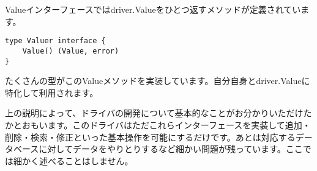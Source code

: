 Valueインターフェースではdriver.Valueをひとつ返すメソッドが定義されています。

\begin{lstlisting}[numbers=none]
type Valuer interface {
    Value() (Value, error)
}
\end{lstlisting}

たくさんの型がこのValueメソッドを実装しています。自分自身とdriver.Valueに特化して利用されます。　

上の説明によって、ドライバの開発について基本的なことがお分かりいただけたかとおもいます。このドライバはただこれらインターフェースを実装して追加・削除・検索・修正といった基本操作を可能にするだけです。あとは対応するデータベースに対してデータをやりとりするなど細かい問題が残っています。ここでは細かく述べることはしません。
